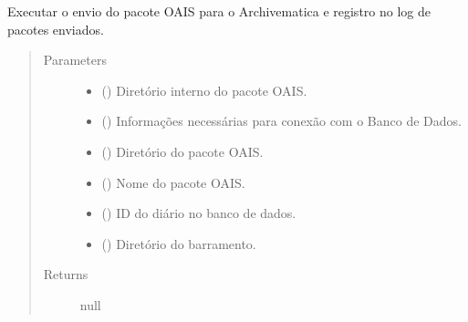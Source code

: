 \documentclass[letterpaper,10pt,english]{sphinxmanual}
\begin{document}
\begin{fulllineitems}
\label{\detokenize{EnvioArquivematica:EnvioArquivematica.envioArchivematica}}
Executar o envio do pacote OAIS para o Archivematica e registro no log de pacotes enviados.
\begin{quote}\begin{description}
\item[{Parameters}] \leavevmode\begin{itemize}
\item {} 
 () \textendash{} Diretório interno do pacote OAIS.

\item {} 
 () \textendash{} Informações necessárias para conexão com o Banco de Dados.

\item {} 
 () \textendash{} Diretório do pacote OAIS.

\item {} 
 () \textendash{} Nome do pacote OAIS.

\item {} 
 () \textendash{} ID do diário no banco de dados.

\item {} 
 () \textendash{} Diretório do barramento.

\end{itemize}

\item[{Returns}] \leavevmode
null

\end{description}\end{quote}

\end{fulllineitems}
\end{document}

